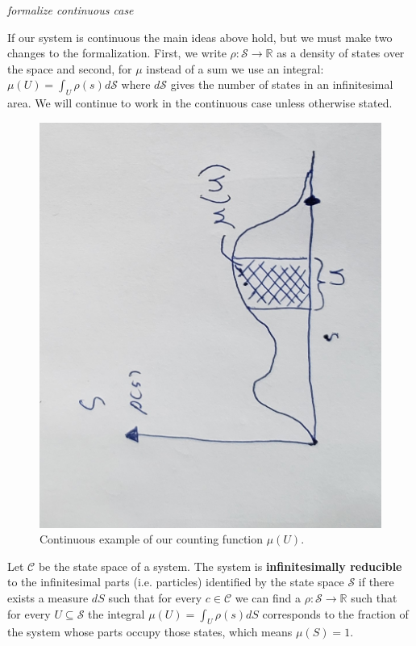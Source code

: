 \documentclass{article}
\begin{document}
	\emph{formalize continuous case}	
	
	If our system is continuous the main ideas above hold, but we must make two changes to the formalization. First, we write $\rho : \mathcal{S} \to \mathbb{R}$ as a density of states over the space and second, for $\mu$ instead of a sum we use an integral: $\mu(U) = \int_{U} \rho(s) d\mathcal{S}$ where $d\mathcal{S}$ gives the number of states in an infinitesimal area. We will continue to work in the continuous case unless otherwise stated.
	
\begin{figure}[!ht]
\centerline{\includegraphics[width=\textwidth,angle=-90,scale=.45]{diagram4.jpg}}
\caption{Continuous example of our counting function $\mu(U)$.}
\end{figure}
	
\begin{defn}
	Let $\mathcal{C}$ be the state space of a system. The system is \textbf{infinitesimally reducible} to the infinitesimal parts (i.e. particles) identified by the state space $\mathcal{S}$ if there exists a measure $dS$ such that for every $c \in \mathcal{C}$ we can find a $\rho : \mathcal{S} \to \mathbb{R}$ such that for every $U \subseteq \mathcal{S}$ the integral $\mu(U) = \int_U \rho(s) dS$ corresponds to the fraction of the system whose parts occupy those states, which means $\mu(S) = 1$.
\end{defn}	
	
\end{document}
